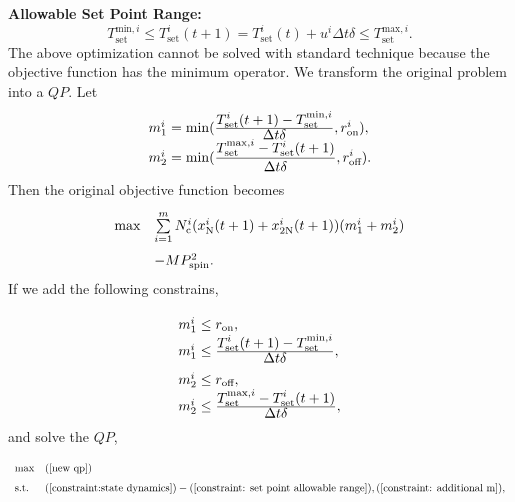\documentclass[journal]{IEEEtran}
\begin{document}
\textbf{Allowable Set Point Range:}
\begin{equation}
\label{constraint: set point allowable range}
T^{\textrm{min},i}_{\textrm{set}} \leq T_{\textrm{set}}^{i}(t+1)= T_{\textrm{set}}^{i}(t)+u^{i}\Delta t\delta \leq T^{\textrm{max},i}_{\textrm{set}}.
\end{equation}
The above optimization cannot be solved with standard technique because the objective function has the minimum operator. We transform the original problem into a $QP$. Let
\begin{equation}
\label{45}
\setlength{\extrarowheight}{7pt}
\begin{array}{l}
m_{1}^{i}=\min(\frac{\displaystyle
T_{\textrm{set}}^{i}(t+1)-T^{\textrm{min},i}_{\textrm{set}}}{\displaystyle\Delta t \delta},r_{\textrm{on}}^{i}),\\
m_{2}^{i}=\min(\displaystyle\frac{T^{\textrm{max},i}_{\textrm{set}}-T_{\textrm{set}}^{i}(t+1)}{\displaystyle\Delta t \delta},r_{\textrm{off}}^{i}).
\end{array}
\end{equation}
Then the original objective function becomes
\begin{equation}
\label{new qp}
\setlength{\extrarowheight}{7pt}
\begin{array}{ll}
\textrm{max} & \sum\limits_{i=1}^{m} N_{\textrm{c}}^{i}(x_{\textrm{N}}^{i}(t+1)+x_{\textrm{2N}}^{i}(t+1))(m_{1}^{i}+m_{2}^{i})\\
& - M P_{\textrm{spin}}^{2}.
\end{array}
\end{equation}
If we add the following constrains,
\begin{equation}
\setlength{\extrarowheight}{7pt}
\label{constraint: additional m}
\begin{array}{l}
m_{1}^{i}\leq r_{\textrm{on}}, \\
m_{1}^{i}\leq \frac{\displaystyle T_{\textrm{set}}^{i}(t+1)-T^{\textrm{min},i}_{\textrm{set}}}{\displaystyle\Delta t \delta},\\
m_{2}^{i}\leq r_{\textrm{off}}, \\
m_{2}^{i}\leq \frac{\displaystyle T^{\textrm{max},i}_{\textrm{set}}-T_{\textrm{set}}^{i}(t+1)}{\displaystyle\Delta t \delta},
\end{array}
\end{equation}
and solve the $QP$,
\begin{equation}
\setlength{\extrarowheight}{7pt}
\label{final QP}
\begin{array}{ll}
\max &(\ref{new qp})\\
\textrm{s.t.} & (\ref{constraint:state dynamics})-(\ref{constraint: set point allowable range}), (\ref{constraint: additional m}),
\end{array}
\end{equation}
\end{document}

